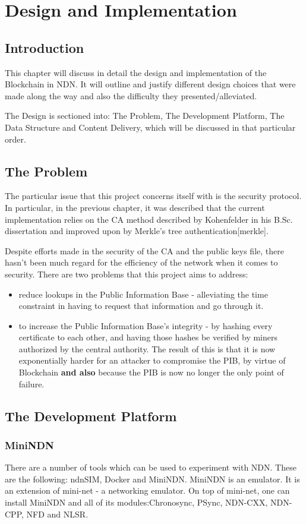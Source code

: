 \chapter{Design and Implementation}
\section{Introduction}
This chapter will discuss in detail the design and implementation of the Blockchain in NDN. It will outline and justify different design choices that were made along the way and also the difficulty they presented/alleviated. 

The Design is sectioned into: The Problem, The Development Platform, The Data Structure and Content Delivery, which will be discussed in that particular order.
\section{The Problem}
The particular issue that this project concerns itself with is the security protocol. In particular, in the previous chapter, it was described that the current implementation relies on the CA method described by Kohenfelder in his B.Sc. dissertation and improved upon by Merkle's tree authentication[merkle]. \par
Despite efforts made in the security of the CA and the public keys file, there hasn't been much regard for the efficiency of the network when it comes to security. There are two problems that this project aims to address: \begin{itemize}

\item reduce lookups in the Public Information Base - alleviating the time constraint in having to request that information and go through it.
\item to increase the Public Information Base's integrity - by hashing every certificate to each other, and having those hashes be verified by miners authorized by the central authority. The result of this is that it is now exponentially harder for an attacker to compromise the PIB, by virtue of Blockchain \textbf{and also} because the PIB is now no longer the only point of failure.
\end{itemize}
\section{The Development Platform}
\subsection{MiniNDN}
There are a number of tools which can be used to experiment with NDN. These are the following: ndnSIM, Docker and MiniNDN.
MiniNDN is an emulator. It is an extension of mini-net - a networking emulator. On top of mini-net, one can install MiniNDN and all of its modules:Chronosync, PSync, NDN-CXX, NDN-CPP, NFD and NLSR.

